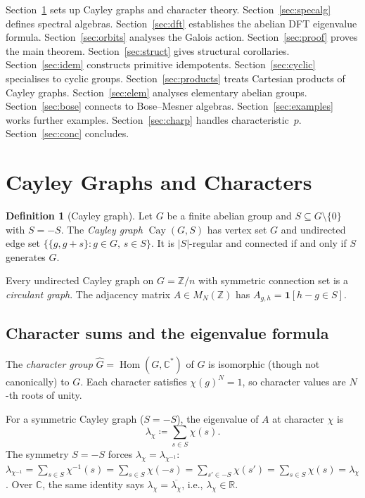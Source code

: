 \documentclass[12pt]{amsart}
\numberwithin{equation}{section}
\theoremstyle{plain}
\theoremstyle{definition}
\newtheorem{definition}[theorem]{Definition}
\DeclareMathOperator{\Hom}{Hom}
\DeclareMathOperator{\Cay}{Cay}
\newcommand{\Z}{\mathbb{Z}}
\newcommand{\R}{\mathbb{R}}
\newcommand{\C}{\mathbb{C}}
\newcommand{\Ghat}{\widehat{G}}
\begin{document}
Section~\ref{sec:cayley} sets up Cayley graphs and character theory.
Section~\ref{sec:specalg} defines spectral algebras.  Section~\ref{sec:dft}
establishes the abelian DFT eigenvalue formula.  Section~\ref{sec:orbits}
analyses the Galois action.  Section~\ref{sec:proof} proves the main
theorem.  Section~\ref{sec:struct} gives structural corollaries.
Section~\ref{sec:idem} constructs primitive idempotents.
Section~\ref{sec:cyclic} specialises to cyclic groups.
Section~\ref{sec:products} treats Cartesian products of Cayley graphs.
Section~\ref{sec:elem} analyses elementary abelian groups.
Section~\ref{sec:bose} connects to Bose--Mesner algebras.
Section~\ref{sec:examples} works further examples.
Section~\ref{sec:charp} handles characteristic~$p$.
Section~\ref{sec:conc} concludes.

\section{Cayley Graphs and Characters}
\label{sec:cayley}

\begin{definition}[Cayley graph]
Let $G$ be a finite abelian group and $S \subseteq G \setminus \{0\}$ with
$S = -S$.  The \emph{Cayley graph} $\Cay(G, S)$ has vertex set $G$ and
undirected edge set $\{\{g, g+s\} : g \in G,\, s \in S\}$.  It is
$|S|$-regular and connected if and only if $S$ generates $G$.
\end{definition}

Every undirected Cayley graph on $G = \Z/n$ with symmetric connection set
is a \emph{circulant graph}.  The adjacency matrix $A \in M_N(\Z)$ has
$A_{g,h} = \mathbf{1}[h - g \in S]$.

\subsection{Character sums and the eigenvalue formula}

The \emph{character group} $\Ghat = \Hom(G, \C^*)$ of $G$ is isomorphic
(though not canonically) to $G$.  Each character satisfies $\chi(g)^N = 1$,
so character values are $N$-th roots of unity.

For a symmetric Cayley graph ($S = -S$), the eigenvalue of $A$ at
character $\chi$ is
\begin{equation}
\label{eq:eigenvalue}
  \lambda_\chi \coloneqq \sum_{s \in S} \chi(s).
\end{equation}
The symmetry $S = -S$ forces $\lambda_\chi = \lambda_{\chi^{-1}}$:
$\lambda_{\chi^{-1}} = \sum_{s \in S} \chi^{-1}(s) = \sum_{s \in S}
\chi(-s) = \sum_{s' \in -S} \chi(s') = \sum_{s \in S} \chi(s) = \lambda_\chi$.
Over $\C$, the same identity says $\lambda_\chi = \overline{\lambda_\chi}$,
i.e., $\lambda_\chi \in \R$.
\end{document}
